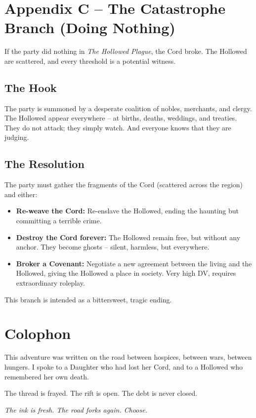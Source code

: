 \documentclass[10pt,twoside]{book}
\begin{document}
\chapter{Appendix C -- The Catastrophe Branch (Doing Nothing)}
If the party did nothing in \textit{The Hollowed Plague}, the Cord broke. The Hollowed are scattered, and every threshold is a potential witness.

\section{The Hook}
The party is summoned by a desperate coalition of nobles, merchants, and clergy. The Hollowed appear everywhere -- at births, deaths, weddings, and treaties. They do not attack; they simply watch. And everyone knows that they are judging.

\section{The Resolution}
The party must gather the fragments of the Cord (scattered across the region) and either:
\begin{itemize}
\item \textbf{Re-weave the Cord:} Re-enslave the Hollowed, ending the haunting but committing a terrible crime.
\item \textbf{Destroy the Cord forever:} The Hollowed remain free, but without any anchor. They become ghosts -- silent, harmless, but everywhere.
\item \textbf{Broker a Covenant:} Negotiate a new agreement between the living and the Hollowed, giving the Hollowed a place in society. Very high DV, requires extraordinary roleplay.
\end{itemize}
This branch is intended as a bittersweet, tragic ending.

\chapter{Colophon}
This adventure was written on the road between hospices, between wars, between hungers. I spoke to a Daughter who had lost her Cord, and to a Hollowed who remembered her own death.

The thread is frayed. The rift is open. The debt is never closed.

\vspace{0.5cm}
\noindent
\textit{The ink is fresh. The road forks again. Choose.}
\end{document}
